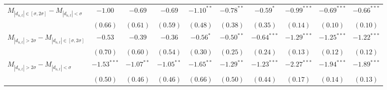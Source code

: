 \begin{tabular}{lccccccccc}
 \hline$M_{|d_{n,t}| \in [\sigma, 2\sigma]} - M_{|d_{n,t}| < \sigma}$ & $-1.00$ & $-0.69$ & $-0.69$ & $-1.10^{**}$ & $-0.78^{**}$ & $-0.59^{*}$ & $-0.99^{***}$ & $-0.69^{***}$ & $-0.66^{***}$ \\ 
   & $(0.66)$ & $(0.61)$ & $(0.59)$ & $(0.48)$ & $(0.38)$ & $(0.35)$ & $(0.14)$ & $(0.10)$ & $(0.10)$ \\ 
  $M_{|d_{n,t}| > 2 \sigma} - M_{|d_{n,t}| \in [\sigma, 2\sigma]}$ & $-0.53$ & $-0.39$ & $-0.36$ & $-0.56^{*}$ & $-0.50^{**}$ & $-0.64^{***}$ & $-1.29^{***}$ & $-1.25^{***}$ & $-1.22^{***}$ \\ 
   & $(0.70)$ & $(0.60)$ & $(0.54)$ & $(0.30)$ & $(0.25)$ & $(0.24)$ & $(0.13)$ & $(0.12)$ & $(0.12)$ \\ 
  $M_{|d_{n,t}| > 2 \sigma} - M_{|d_{n,t}| < \sigma}$ & $-1.53^{***}$ & $-1.07^{**}$ & $-1.05^{**}$ & $-1.65^{**}$ & $-1.29^{**}$ & $-1.23^{***}$ & $-2.27^{***}$ & $-1.94^{***}$ & $-1.89^{***}$ \\ 
   & $(0.50)$ & $(0.46)$ & $(0.46)$ & $(0.66)$ & $(0.50)$ & $(0.44)$ & $(0.17)$ & $(0.14)$ & $(0.13)$ \\ 
   \hline 
\end{tabular}
